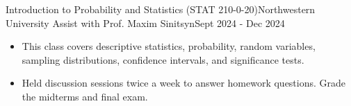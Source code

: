     \resumeSubheading
    {Introduction to Probability and Statistics (STAT 210-0-20)}{Northwestern University}
    {Assist with Prof. Maxim Sinitsyn}{Sept 2024 - Dec 2024}
    \begin{itemize}
        \item \small This class covers descriptive statistics, probability, random variables, sampling distributions, confidence intervals, and significance tests.
        \item \small Held discussion sessions twice a week to answer homework questions. Grade the midterms and final exam.
    \end{itemize}
    \vspace{-5pt}
	
\resumeSubHeadingListEnd